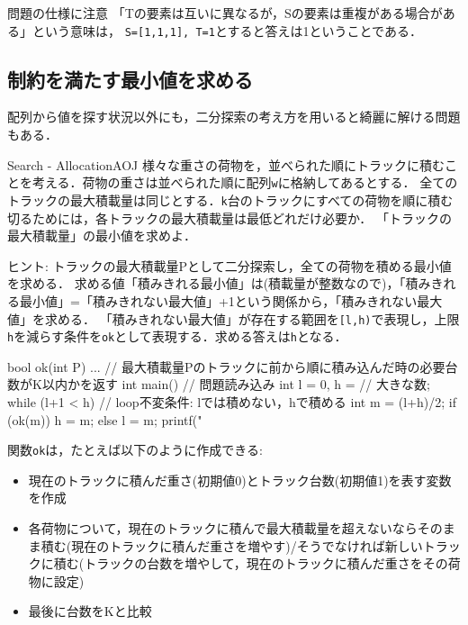 \begin{debugbox}{問題の仕様に注意}
「Tの要素は互いに異なるが，Sの要素は重複がある場合がある」という意味は，
  \texttt{S=[1,1,1], T={1}}とすると答えは1ということである．
\end{debugbox}


\subsection{制約を満たす最小値を求める}

配列から値を探す状況以外にも，二分探索の考え方を用いると綺麗に解ける問題もある．

\begin{pbox}{Search - Allocation}{AOJ}
様々な重さの荷物を，並べられた順にトラックに積むことを考える．荷物の重さは並べられた順に配列\texttt{w}に格納してあるとする．
全てのトラックの最大積載量は同じとする．\texttt{k}台のトラックにすべての荷物を順に積む切るためには，各トラックの最大積載量は最低どれだけ必要か．
「トラックの最大積載量」の最小値を求めよ．

\end{pbox}

ヒント: トラックの最大積載量Pとして二分探索し，全ての荷物を積める最小値を求める．
求める値「積みきれる最小値」は(積載量が整数なので)，「積みきれる最小値」=「積みきれない最大値」+1という関係から，「積みきれない最大値」を求める．
「積みきれない最大値」が存在する範囲を\texttt{[l,h)}で表現し，上限\texttt{h}を減らす条件を\texttt{ok}として表現する．求める答えは\texttt{h}となる．
\begin{cbox}[emph={l,h}]
bool ok(int P) {
  ... // 最大積載量Pのトラックに前から順に積み込んだ時の必要台数がK以内かを返す
}
int main() {
    // 問題読み込み
    int l = 0, h = // 大きな数;
    while (l+1 < h) {
        // loop不変条件: lでは積めない，hで積める
        int m = (l+h)/2;
        if (ok(m)) h = m; else l = m;
    }
    printf("
}
\end{cbox}

関数\texttt{ok}は，たとえば以下のように作成できる:
\begin{itemize}
\setlength{\itemsep}{0pt}
\item 現在のトラックに積んだ重さ(初期値0)とトラック台数(初期値1)を表す変数を作成
\item 各荷物について，現在のトラックに積んで最大積載量を超えないならそのまま積む(現在のトラックに積んだ重さを増やす)/そうでなければ新しいトラックに積む(トラックの台数を増やして，現在のトラックに積んだ重さをその荷物に設定)
\item 最後に台数をKと比較
\end{itemize}

